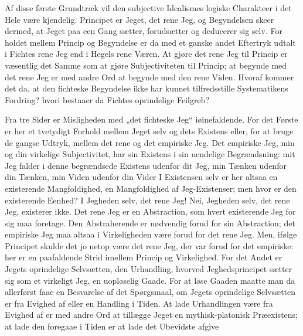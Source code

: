 \documentclass[11pt]{book}
\newcommand{\opage}[1]{\marginnote{\footnotesize\textit{[#1]}}}
\begin{document}
Af disse første Grundtræk vil den subjective Idealismes logiske
Charakteer i det Hele være kjendelig. Principet er Jeget, det rene
Jeg, og Begyndelsen skeer dermed, at Jeget paa een Gang sætter,
forudsætter og deducerer sig selv. For\-%
\opage{33} \setcounter{footnote}{0}%
holdet mellem Princip og Begyndelse er da med et ganske andet
Eftertryk udtalt i Fichtes rene Jeg end i Hegels rene Væren. At gjøre
det rene Jeg til Princip er væsentlig det Samme som at gjøre
Subjectiviteten til Princip; at begynde med det rene Jeg er med andre
Ord at begynde med den rene Viden. Hvoraf kommer det da, at den
fichteske Begyndelse ikke har kunnet tilfredsstille Systematikens
Fordring? hvori bestaaer da Fichtes oprindelige Feilgreb?

Fra tre Sider er Misligheden med „det fichteske Jeg“ iøinefaldende.
For det Første er her et tvetydigt Forhold mellem Jeget selv og dets
Existens eller, for at bruge de gangse Udtryk, mellem det rene og det
empiriske Jeg. Det empiriske Jeg, min og din virkelige Subjectivitet,
har sin Existens i sin uendelige Begrændsning: mit Jeg falder i denne
begrændsede Existens udenfor dit Jeg, min Tænken udenfor din Tænken,
min Viden udenfor din Vider
I Existensen selv er her altsaa en existerende Mangfoldighed, en
Mangfoldighed af Jeg-Existenser; men hvor er den existerende Eenhed? I
Jegheden selv, det rene Jeg! Nei, Jegheden selv, det rene Jeg,
existerer ikke. Det rene Jeg er en Abstraction, som hvert existerende
Jeg for sig maa foretage. Den Abstraherende er nødvendig forud for sin
Abstraction; det empiriske Jeg maa altsaa i Virkeligheden være forud
for det rene Jeg. Men, ifølge Principet skulde det jo netop være det
rene Jeg, der var forud for det empiriske: her er en paafaldende Strid
imellem Princip og Virkelighed. For det Andet er Jegets oprindelige
Selvsætten, den Urhandling, hvorved Jeghedsprincipet sætter sig som et
virkeligt Jeg, en uopløselig Gaade. For at løse Gaaden maatte man da
allerførst faae en Besvarelse af det Spørgsmaal, om Jegets oprindelige
Selvsætten er fra Evighed af eller en Handling i Tiden. At lade
Urhandlingen være fra Evighed af er med andre Ord at tillægge Jeget en
mythisk-platonisk Præexistens; at lade den foregaae i Tiden er at lade
det Ubevidste afgive
\end{document}
